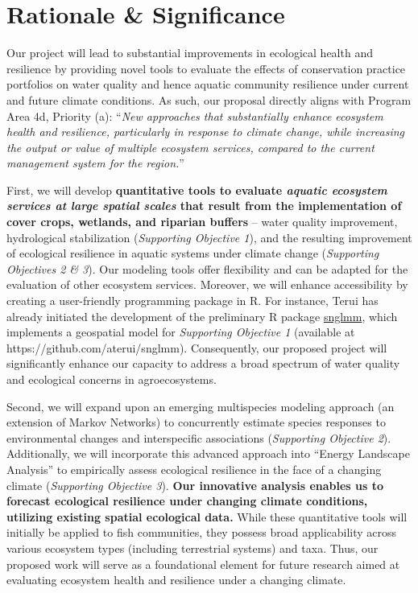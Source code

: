 \documentclass[12pt, class=article, crop=false]{standalone}
\begin{document}
\section{Rationale \& Significance}

Our project will lead to substantial improvements in ecological health and resilience by providing novel tools to evaluate the effects of conservation practice portfolios on water quality and hence aquatic community resilience under current and future climate conditions.
As such, our proposal directly aligns with Program Area 4d, Priority (a): ``\textit{New approaches that substantially enhance ecosystem health and resilience, particularly in response to climate change, while increasing the output or value of multiple ecosystem services, compared to the current management system for the region.}''

First, we will develop \textbf{quantitative tools to evaluate \textit{aquatic ecosystem services at large spatial scales} that result from the implementation of cover crops, wetlands, and riparian buffers} -- water quality improvement, hydrological stabilization (\textit{Supporting Objective 1}), and the resulting improvement of ecological resilience in aquatic systems under climate change (\textit{Supporting Objectives 2 \& 3}).
Our modeling tools offer flexibility and can be adapted for the evaluation of other ecosystem services.
Moreover, we will enhance accessibility by creating a user-friendly programming package in R.
For instance, Terui has already initiated the development of the preliminary R package \url{snglmm}, which implements a geospatial model for \textit{Supporting Objective 1} (available at https://github.com/aterui/snglmm).
Consequently, our proposed project will significantly enhance our capacity to address a broad spectrum of water quality and ecological concerns in agroecosystems.

Second, we will expand upon an emerging multispecies modeling approach (an extension of Markov Networks) to concurrently estimate species responses to environmental changes and interspecific associations (\textit{Supporting Objective 2}).
Additionally, we will incorporate this advanced approach into ``Energy Landscape Analysis'' to empirically assess ecological resilience in the face of a changing climate (\textit{Supporting Objective 3}).
\textbf{Our innovative analysis enables us to forecast ecological resilience under changing climate conditions, utilizing existing spatial ecological data.}
While these quantitative tools will initially be applied to fish communities, they possess broad applicability across various ecosystem types (including terrestrial systems) and taxa.
Thus, our proposed work will serve as a foundational element for future research aimed at evaluating ecosystem health and resilience under a changing climate.
\end{document}
